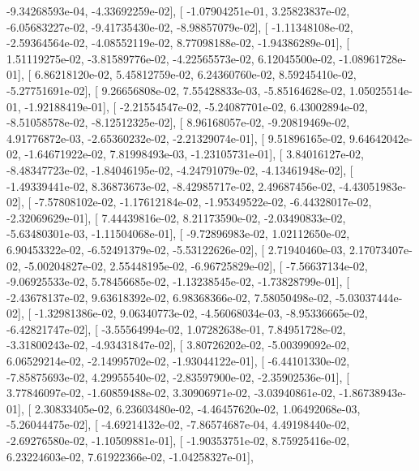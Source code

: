 \documentclass{article}
\begin{document}
         -9.34268593e-04,  -4.33692259e-02],
       [ -1.07904251e-01,   3.25823837e-02,  -6.05683227e-02,
         -9.41735430e-02,  -8.98857079e-02],
       [ -1.11348108e-02,  -2.59364564e-02,  -4.08552119e-02,
          8.77098188e-02,  -1.94386289e-01],
       [  1.51119275e-02,  -3.81589776e-02,  -4.22565573e-02,
          6.12045500e-02,  -1.08961728e-01],
       [  6.86218120e-02,   5.45812759e-02,   6.24360760e-02,
          8.59245410e-02,  -5.27751691e-02],
       [  9.26656808e-02,   7.55428833e-03,  -5.85164628e-02,
          1.05025514e-01,  -1.92188419e-01],
       [ -2.21554547e-02,  -5.24087701e-02,   6.43002894e-02,
         -8.51058578e-02,  -8.12512325e-02],
       [  8.96168057e-02,  -9.20819469e-02,   4.91776872e-03,
         -2.65360232e-02,  -2.21329074e-01],
       [  9.51896165e-02,   9.64642042e-02,  -1.64671922e-02,
          7.81998493e-03,  -1.23105731e-01],
       [  3.84016127e-02,  -8.48347723e-02,  -1.84046195e-02,
         -4.24791079e-02,  -4.13461948e-02],
       [ -1.49339441e-02,   8.36873673e-02,  -8.42985717e-02,
          2.49687456e-02,  -4.43051983e-02],
       [ -7.57808102e-02,  -1.17612184e-02,  -1.95349522e-02,
         -6.44328017e-02,  -2.32069629e-01],
       [  7.44439816e-02,   8.21173590e-02,  -2.03490833e-02,
         -5.63480301e-03,  -1.11504068e-01],
       [ -9.72896983e-02,   1.02112650e-02,   6.90453322e-02,
         -6.52491379e-02,  -5.53122626e-02],
       [  2.71940460e-03,   2.17073407e-02,  -5.00204827e-02,
          2.55448195e-02,  -6.96725829e-02],
       [ -7.56637134e-02,  -9.06925533e-02,   5.78456685e-02,
         -1.13238545e-02,  -1.73828799e-01],
       [ -2.43678137e-02,   9.63618392e-02,   6.98368366e-02,
          7.58050498e-02,  -5.03037444e-02],
       [ -1.32981386e-02,   9.06340773e-02,  -4.56068034e-03,
         -8.95336665e-02,  -6.42821747e-02],
       [ -3.55564994e-02,   1.07282638e-01,   7.84951728e-02,
         -3.31800243e-02,  -4.93431847e-02],
       [  3.80726202e-02,  -5.00399092e-02,   6.06529214e-02,
         -2.14995702e-02,  -1.93044122e-01],
       [ -6.44101330e-02,  -7.85875693e-02,   4.29955540e-02,
         -2.83597900e-02,  -2.35902536e-01],
       [  3.77846097e-02,  -1.60859488e-02,   3.30906971e-02,
         -3.03940861e-02,  -1.86738943e-01],
       [  2.30833405e-02,   6.23603480e-02,  -4.46457620e-02,
          1.06492068e-03,  -5.26044475e-02],
       [ -4.69214132e-02,  -7.86574687e-04,   4.49198440e-02,
         -2.69276580e-02,  -1.10509881e-01],
       [ -1.90353751e-02,   8.75925416e-02,   6.23224603e-02,
          7.61922366e-02,  -1.04258327e-01],
\end{document}
